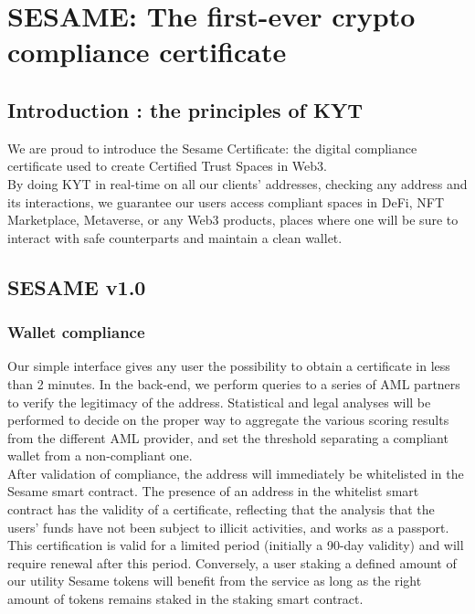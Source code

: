 ﻿\documentclass[a4paper]{article}
\let\OldTexttrademark\texttrademark
\renewcommand{\texttrademark}{\OldTexttrademark\xspace}%
\begin{document}
\newpage
\section{SESAME: The first-ever crypto compliance certificate}
\subsection{Introduction : the principles of KYT}
We are proud to introduce the Sesame Certificate: the digital compliance certificate used to create Certified Trust Spaces\texttrademark in Web3. \\

By doing KYT in real-time on all our clients’ addresses, checking any address and its interactions, we guarantee our users access compliant spaces in DeFi, NFT Marketplace, Metaverse, or any Web3 products, places where one will be sure to interact with safe counterparts and maintain a clean wallet.

\subsection{SESAME v1.0}
\subsubsection{Wallet compliance}
Our simple interface gives any user the possibility to obtain a certificate in less than 2 minutes. In the back-end, we perform queries to a series of AML partners to verify the legitimacy of the address. Statistical and legal analyses will be performed to decide on the proper way to aggregate the various scoring results from the different AML provider, and set the threshold separating a compliant wallet from a non-compliant one.   \\

After validation of compliance, the address will immediately be whitelisted in the Sesame smart contract. The presence of an address in the whitelist smart contract has the validity of a certificate, reflecting that the analysis that the users' funds have not been subject to illicit activities, and works as a passport. This certification is valid for a limited period (initially a 90-day validity) and will require renewal after this period. Conversely, a user staking a defined amount of our utility Sesame tokens will benefit from the service as long as the right amount of tokens remains staked in the staking smart contract. \\
\end{document}
